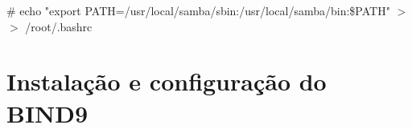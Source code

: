 \# echo "export PATH=/usr/local/samba/sbin:/usr/local/samba/bin:\$PATH"  $>$$>$ /root/.bashrc



\section{Instalação e configuração do BIND9}

